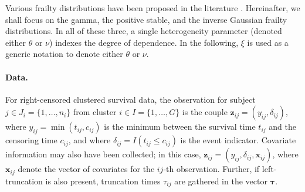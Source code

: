 Various frailty distributions have been proposed in the literature \cite[Chapter~4]{DuchateauJanssen08}.
Hereinafter, we shall focus on
  the gamma, the positive stable, and the inverse Gaussian frailty distributions.
In all of these three, a single heterogeneity parameter (denoted either $\theta$ or $\nu$)
  indexes the degree of dependence.
In the following, $\xi$ is used as a generic notation to denote either $\theta$ or $\nu$.



\paragraph{Data.}
For right-censored clustered survival data,
  the observation for subject $j \in J_i = \{1, \ldots , n_i \}$
  from cluster $i \in I = \{1, \ldots , G\}$ is the couple $\bm z_{ij} = (y_{ij} , \delta_{ij} )$,
  where $y_{ij} = \min(t_{ij}, c_{ij})$ is the minimum between the survival time $t_{ij}$
    and the censoring time $c_{ij}$,
  and where $\delta_{ij} = I(t_{ij} \le c_{ij})$ is the event indicator.
  Covariate information may also have been collected; in this case,
  $\bm z_{ij} = (y_{ij} , \delta_{ij}, \bm{x}_{ij} )$,
  where $\bm x_{ij}$ denote the vector of covariates for the $ij$-th observation.
Further, if left-truncation is also present,
  truncation times $\tau_{ij}$ are gathered in the vector $\bm{\tau}$.



